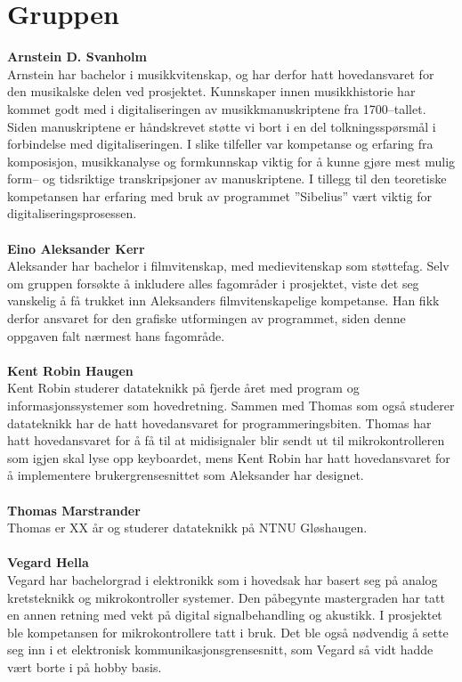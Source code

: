 \chapter{Gruppen}

\textbf{Arnstein D. Svanholm} \\
Arnstein har bachelor i musikkvitenskap, og har derfor hatt hovedansvaret for den musikalske delen ved prosjektet. Kunnskaper innen musikkhistorie har kommet godt med i digitaliseringen av musikkmanuskriptene fra 1700–tallet. Siden manuskriptene er håndskrevet støtte vi bort i en del tolkningsspørsmål i forbindelse med digitaliseringen. I slike tilfeller var kompetanse og erfaring fra komposisjon, musikkanalyse og formkunnskap viktig for å kunne gjøre mest mulig form– og tidsriktige transkripsjoner av manuskriptene. I tillegg til den teoretiske kompetansen har erfaring med bruk av programmet ”Sibelius” \cite{sibelius} vært viktig for digitaliseringsprosessen.\\\\
\textbf{Eino Aleksander Kerr} \\
Aleksander har bachelor i filmvitenskap, med medievitenskap som støttefag. Selv om gruppen forsøkte å inkludere alles fagområder i prosjektet, viste det seg vanskelig å få trukket inn Aleksanders filmvitenskapelige kompetanse. Han fikk derfor ansvaret for den grafiske utformingen av programmet, siden denne oppgaven falt nærmest hans fagområde.
\\\\
\textbf{Kent Robin Haugen} \\
Kent Robin studerer datateknikk på fjerde året med program og informasjonssystemer som hovedretning. Sammen med Thomas som også studerer datateknikk har de hatt hovedansvaret for programmeringsbiten. Thomas har hatt hovedansvaret for å få til at midisignaler blir sendt ut til mikrokontrolleren som igjen skal lyse opp keyboardet, mens Kent Robin har hatt hovedansvaret for å implementere brukergrensesnittet som Aleksander har designet. 
\\\\
\textbf{Thomas Marstrander} \\
Thomas er XX år og studerer datateknikk på NTNU Gløshaugen.\\\\
\textbf{Vegard Hella} \\
Vegard har bachelorgrad i elektronikk som i hovedsak har basert seg på analog kretsteknikk og mikrokontroller systemer. Den påbegynte mastergraden har tatt en annen retning med vekt på digital signalbehandling og akustikk. I prosjektet ble kompetansen for mikrokontrollere tatt i bruk. Det ble også nødvendig å sette seg inn i et elektronisk kommunikasjonsgrensesnitt, som Vegard så vidt hadde vært borte i på hobby basis.\\
